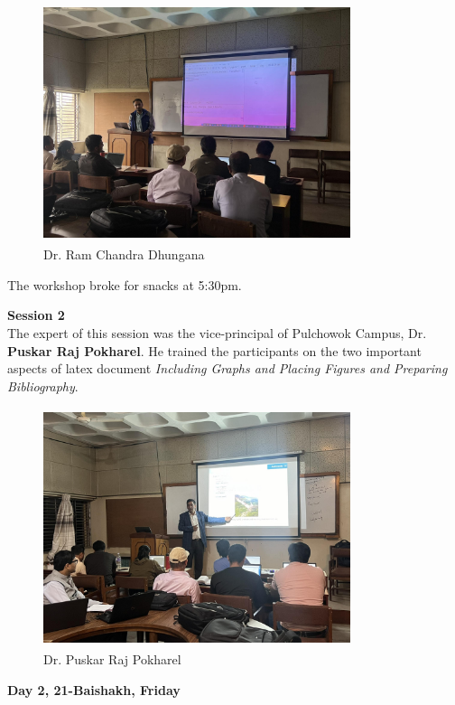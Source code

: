 \documentclass[a4paper,12pt]{report}
\begin{document}
\begin{figure}[h!]
  \centering
  \includegraphics[height=7cm, width=9cm]{rcd.jpg}
  \caption{Dr. Ram Chandra Dhungana}
\end{figure}
\vspace{2mm}
The workshop broke for snacks at 5:30pm.

\vspace{5mm}

{\bfseries \large Session 2}\\[3mm]
The expert of this session was the vice-principal of Pulchowok Campus, Dr. \textbf{Puskar Raj Pokharel}. He trained the participants on the two important aspects of latex document \textit{Including Graphs and Placing Figures and Preparing Bibliography}.
\vspace{3mm}

\begin{figure}[h!]
  \centering
  \includegraphics[height=7cm, width=9cm]{puskar.jpg}
  \caption{Dr. Puskar Raj Pokharel}
\end{figure}
\clearpage

\begin{center}
  {\bfseries \Large Day 2, 21-Baishakh, Friday}
\end{center}
\vspace{3mm}
\end{document}
